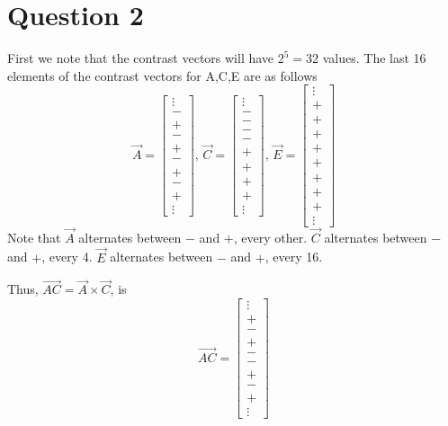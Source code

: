 \documentclass{article}
\begin{document}
\section*{Question 2}
First we note that the contrast vectors will have $2^5 = 32$ values.
The last 16 elements of the contrast vectors for A,C,E are as follows
\begin{equation*}
    \vec{A} = \begin{bmatrix}\vdots \\ - \\ + \\ - \\ + \\ - \\ + \\ - \\ + \\ \vdots\end{bmatrix}
    \text{, }
    \vec{C} = \begin{bmatrix}\vdots \\ - \\ - \\ - \\ - \\ + \\ + \\ + \\ + \\ \vdots \end{bmatrix}
    \text{, }
    \vec{E} = \begin{bmatrix}\vdots \\ + \\ + \\ + \\ + \\ + \\ + \\ + \\ + \\ \vdots \end{bmatrix}
\end{equation*}
Note that $\vec{A}$ alternates between $-$ and $+$, every other.
$\vec{C}$ alternates between $-$ and $+$, every 4.
$\vec{E}$ alternates between $-$ and $+$, every 16.

Thus, $\vec{AC} = \vec{A} \times \vec{C}$, is 
\begin{equation*}
    \vec{AC} = \begin{bmatrix}\vdots \\ + \\ - \\ + \\ - \\ - \\ + \\ - \\ + \\ \vdots \end{bmatrix}
\end{equation*}
\end{document}
